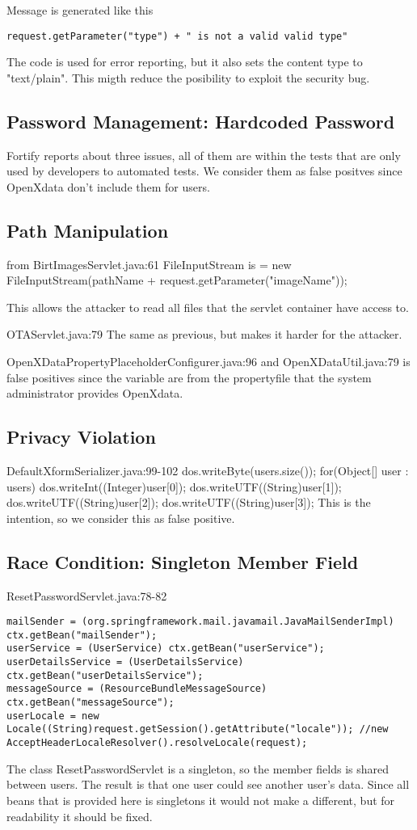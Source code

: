 \documentclass[11pt,a4paper]{article}
\theoremstyle{definition}
\begin{document}
Message is generated like this
\begin{lstlisting}
request.getParameter("type") + " is not a valid valid type"
\end{lstlisting}
The code is used for error reporting, but it also sets the content type to "text/plain".
This migth reduce the posibility to exploit the security bug.

\subsection{Password Management: Hardcoded Password}
Fortify reports about three issues, all of them are within the tests that are only used
by developers to automated tests. We consider them as false positves since OpenXdata don't
include them for users.

\subsection{Path Manipulation}
from BirtImagesServlet.java:61
FileInputStream is = new FileInputStream(pathName + request.getParameter("imageName"));

This allows the attacker to read all files that the servlet container have access to.

OTAServlet.java:79
The same as previous, but makes it harder for the attacker.

OpenXDataPropertyPlaceholderConfigurer.java:96 and OpenXDataUtil.java:79 
is false positives since the variable are from the propertyfile that the system administrator provides OpenXdata.

\subsection{Privacy Violation}
DefaultXformSerializer.java:99-102
dos.writeByte(users.size());
for(Object[] user : users){
    dos.writeInt((Integer)user[0]);
    dos.writeUTF((String)user[1]);
    dos.writeUTF((String)user[2]);
    dos.writeUTF((String)user[3]);
}
This is the intention, so we consider this as false positive.

\subsection{Race Condition: Singleton Member Field}
ResetPasswordServlet.java:78-82
\begin{lstlisting}
mailSender = (org.springframework.mail.javamail.JavaMailSenderImpl) ctx.getBean("mailSender");
userService = (UserService) ctx.getBean("userService");
userDetailsService = (UserDetailsService) ctx.getBean("userDetailsService");
messageSource = (ResourceBundleMessageSource) ctx.getBean("messageSource");
userLocale = new Locale((String)request.getSession().getAttribute("locale")); //new AcceptHeaderLocaleResolver().resolveLocale(request);
\end{lstlisting}
The class ResetPasswordServlet is a singleton, so the member fields is shared between users.
The result is that one user could see another user's data.
Since all beans that is provided here is singletons it would not make a different, but for readability it should be fixed.
\end{document}
